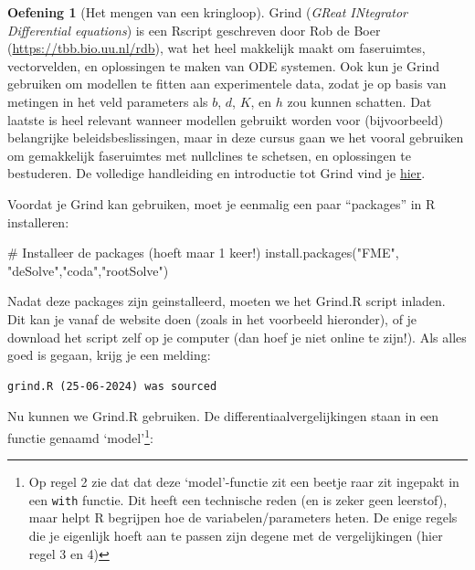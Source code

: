 \documentclass[
  a4paper,
]{scrbook}
\newenvironment{Shaded}{\begin{snugshade}}{\end{snugshade}}
\newcommand{\CommentTok}[1]{\textcolor[rgb]{0.37,0.37,0.37}{#1}}
\newcommand{\FunctionTok}[1]{\textcolor[rgb]{0.28,0.35,0.67}{#1}}
\newcommand{\NormalTok}[1]{\textcolor[rgb]{0.00,0.23,0.31}{#1}}
\newcommand{\StringTok}[1]{\textcolor[rgb]{0.13,0.47,0.30}{#1}}
\theoremstyle{definition}
\newtheorem{exercise}{Oefening}[chapter]
\theoremstyle{remark}
\begin{document}
\begin{exercise}[Het mengen van een
kringloop]
Grind (\emph{GReat INtegrator Differential equations}) is een Rscript
geschreven door Rob de Boer (\url{https://tbb.bio.uu.nl/rdb}), wat het
heel makkelijk maakt om faseruimtes, vectorvelden, en oplossingen te
maken van ODE systemen. Ook kun je Grind gebruiken om modellen te fitten
aan experimentele data, zodat je op basis van metingen in het veld
parameters als \(b\), \(d\), \(K\), en \(h\) zou kunnen schatten. Dat
laatste is heel relevant wanneer modellen gebruikt worden voor
(bijvoorbeeld) belangrijke beleidsbeslissingen, maar in deze cursus gaan
we het vooral gebruiken om gemakkelijk faseruimtes met nullclines te
schetsen, en oplossingen te bestuderen. De volledige handleiding en
introductie tot Grind vind je
\href{https://tbb.bio.uu.nl/rdb/grindR/basics.html}{hier}.

Voordat je Grind kan gebruiken, moet je eenmalig een paar ``packages''
in R installeren:

\begin{Shaded}
\begin{Highlighting}[]
\CommentTok{\# Installeer de packages (hoeft maar 1 keer!)}
\FunctionTok{install.packages}\NormalTok{(}\StringTok{"FME"}\NormalTok{, }\StringTok{"deSolve"}\NormalTok{,}\StringTok{"coda"}\NormalTok{,}\StringTok{"rootSolve"}\NormalTok{) }
\end{Highlighting}
\end{Shaded}

Nadat deze packages zijn geinstalleerd, moeten we het Grind.R script
inladen. Dit kan je vanaf de website doen (zoals in het voorbeeld
hieronder), of je download het script zelf op je computer (dan hoef je
niet online te zijn!). Als alles goed is gegaan, krijg je een melding:

\begin{verbatim}
grind.R (25-06-2024) was sourced
\end{verbatim}

Nu kunnen we Grind.R gebruiken. De differentiaalvergelijkingen staan in
een functie genaamd `model'\footnote{Op regel 2 zie dat dat deze
  `model'-functie zit een beetje raar zit ingepakt in een \texttt{with}
  functie. Dit heeft een technische reden (en is zeker geen leerstof),
  maar helpt R begrijpen hoe de variabelen/parameters heten. De enige
  regels die je eigenlijk hoeft aan te passen zijn degene met de
  vergelijkingen (hier regel 3 en 4)}:


\end{exercise}
\end{document}
